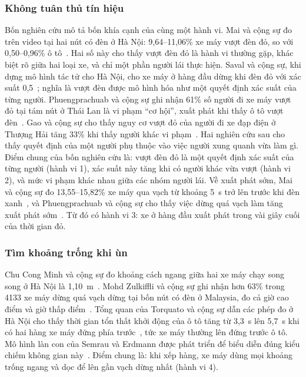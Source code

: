 \documentclass[../main.tex]{subfiles}
\begin{document}
\subsubsection{Không tuân thủ tín hiệu}

Bốn nghiên cứu mô tả bốn khía cạnh của cùng một hành vi. Mai và cộng sự đo trên video tại hai nút có đèn ở Hà Nội: 9,64--11,06\% xe máy vượt đèn đỏ, so với 0,50--0,96\% ô tô~\cite{mai2019signal}. Hai số này cho thấy vượt đèn đỏ là hành vi thường gặp, khác biệt rõ giữa hai loại xe, và chỉ một phần người lái thực hiện. Saval và cộng sự, khi dựng mô hình tác tử cho Hà Nội, cho xe máy ở hàng đầu dừng khi đèn đỏ với xác suất 0,5~\cite{saval2023mixed}; nghĩa là vượt đèn được mô hình hóa như một quyết định xác suất của từng người. Phuengprachuab và cộng sự ghi nhận 61\% số người đi xe máy vượt đỏ tại tám nút ở Thái Lan là vi phạm ``cơ hội'', xuất phát khi thấy ô tô vượt đèn~\cite{phuengprachuab2023opportunistic}. Gao và cộng sự cho thấy nguy cơ vượt đỏ của người đi xe đạp điện ở Thượng Hải tăng 33\% khi thấy người khác vi phạm~\cite{gao2020redlight}. Hai nghiên cứu sau cho thấy quyết định của một người phụ thuộc vào việc người xung quanh vừa làm gì. Điểm chung của bốn nghiên cứu là: vượt đèn đỏ là một quyết định xác suất của từng người (hành vi 1), xác suất này tăng khi có người khác vừa vượt (hành vi 2), và mức vi phạm khác nhau giữa các nhóm người lái. Về xuất phát sớm, Mai và cộng sự đo 13,55--15,82\% xe máy qua vạch từ khoảng 5~s trở lên trước khi đèn xanh~\cite{mai2019signal}, và Phuengprachuab và cộng sự cho thấy việc dừng quá vạch làm tăng xuất phát sớm~\cite{phuengprachuab2023opportunistic}. Từ đó có hành vi 3: xe ở hàng đầu xuất phát trong vài giây cuối của thời gian đỏ.

\subsubsection{Tìm khoảng trống khi ùn}

Chu Cong Minh và cộng sự đo khoảng cách ngang giữa hai xe máy chạy song song ở Hà Nội là 1,10~m~\cite{chu2005speed}. Mohd Zulkiffli và cộng sự ghi nhận hơn 63\% trong 4133 xe máy dừng quá vạch dừng tại bốn nút có đèn ở Malaysia, đo cả giờ cao điểm và giờ thấp điểm~\cite{zulkiffli2023stopping}. Tổng quan của Torquato và cộng sự dẫn các phép đo ở Hà Nội cho thấy thời gian tổn thất khởi động của ô tô tăng từ 3,3~s lên 5,7~s khi có hai hàng xe máy đứng phía trước~\cite{torquato2020motorcycles}, tức xe máy thường lên đứng trước ô tô. Mô hình làn con của Semrau và Erdmann được phát triển để biểu diễn đúng kiểu chiếm không gian này~\cite{semrau2016chinese}. Điểm chung là: khi xếp hàng, xe máy dùng mọi khoảng trống ngang và dọc để lên gần vạch dừng nhất (hành vi 4).
\end{document}

